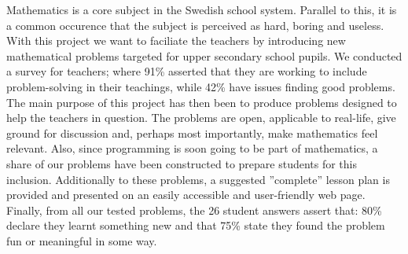 \noindent \textcolor{WildStrawberry}{
    Mathematics is a core subject in the Swedish school system. Parallel to this, it is a common occurence that the subject is perceived as hard, boring and useless. With this project we want to faciliate the teachers by introducing new mathematical problems targeted for upper secondary school pupils. We conducted a survey for teachers; where 91\% asserted that they are working to include problem-solving in their teachings, while 42\% have issues finding good problems. The main purpose of this project has then been to produce problems designed to help the teachers in question. The problems are open, applicable to real-life, give ground for discussion and, perhaps most importantly, make mathematics feel relevant. Also, since programming is soon going to be part of mathematics, a share of our problems have been constructed to prepare students for this inclusion. Additionally to these problems, a suggested ''complete'' lesson plan is provided and presented on an easily accessible and user-friendly web page. Finally, from all our tested problems, the 26 student answers assert that: 80\% declare they learnt something new and that 75\% state they found the problem fun or meaningful in some way.
    }
    
    
    
    
